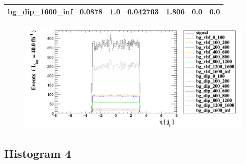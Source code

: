\documentclass[a4paper, 10pt]{article}
\begin{document}
\begin{table}[H]
\begin{center}
\begin{tabular}{|m{23.0mm}|m{23.0mm}|m{18.0mm}|m{19.0mm}|m{19.0mm}|m{19.0mm}|m{19.0mm}|}
      \hline
      {\cellcolor{white}         bg\_dip\_1600\_inf}& {\cellcolor{white}         0.0878}& {\cellcolor{white}         1.0}& {\cellcolor{white}         0.042703}& {\cellcolor{white}         1.806}& {\cellcolor{green}         0.0}& {\cellcolor{green}         0.0}\\
\hline
    \end{tabular}
  \end{center}
\end{table}

\begin{figure}[H]
  \begin{center}
    \includegraphics[scale=0.45]{selection_2.png}\\
\caption{   }
  \end{center}
\end{figure}
      \newpage
\subsection{ Histogram 4}
\end{document}
